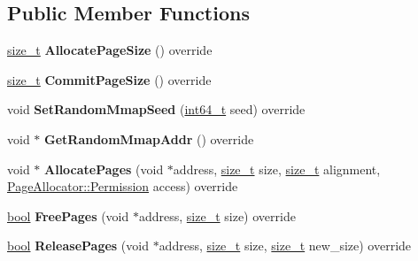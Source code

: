 \subsection*{Public Member Functions}
\begin{DoxyCompactItemize}
\item 
\mbox{\label{classv8_1_1base_1_1PageAllocator_a5a7cbf435795503784e9e08c2a6c6327}} 
\mbox{\hyperlink{classsize__t}{size\+\_\+t}} {\bfseries Allocate\+Page\+Size} () override
\item 
\mbox{\label{classv8_1_1base_1_1PageAllocator_a76b58541f0310ba89be271d4ec217e67}} 
\mbox{\hyperlink{classsize__t}{size\+\_\+t}} {\bfseries Commit\+Page\+Size} () override
\item 
\mbox{\label{classv8_1_1base_1_1PageAllocator_a2eb228e04b3015c0d32f2a2dafd9b16a}} 
void {\bfseries Set\+Random\+Mmap\+Seed} (\mbox{\hyperlink{classint64__t}{int64\+\_\+t}} seed) override
\item 
\mbox{\label{classv8_1_1base_1_1PageAllocator_a3291aa6434bac10f98fd4a4e26d39f04}} 
void $\ast$ {\bfseries Get\+Random\+Mmap\+Addr} () override
\item 
\mbox{\label{classv8_1_1base_1_1PageAllocator_af147914bd8d4f8ecc90a8b9f6c4bfa89}} 
void $\ast$ {\bfseries Allocate\+Pages} (void $\ast$address, \mbox{\hyperlink{classsize__t}{size\+\_\+t}} size, \mbox{\hyperlink{classsize__t}{size\+\_\+t}} alignment, \mbox{\hyperlink{classv8_1_1PageAllocator_a88f74b164fe97e053259f67a95758415}{Page\+Allocator\+::\+Permission}} access) override
\item 
\mbox{\label{classv8_1_1base_1_1PageAllocator_a8f83383c240965ca43dedf7e5f9064af}} 
\mbox{\hyperlink{classbool}{bool}} {\bfseries Free\+Pages} (void $\ast$address, \mbox{\hyperlink{classsize__t}{size\+\_\+t}} size) override
\item 
\mbox{\label{classv8_1_1base_1_1PageAllocator_abaadd3d1e886df5b18caac3cad323077}} 
\mbox{\hyperlink{classbool}{bool}} {\bfseries Release\+Pages} (void $\ast$address, \mbox{\hyperlink{classsize__t}{size\+\_\+t}} size, \mbox{\hyperlink{classsize__t}{size\+\_\+t}} new\+\_\+size) override

\end{DoxyCompactItemize}
